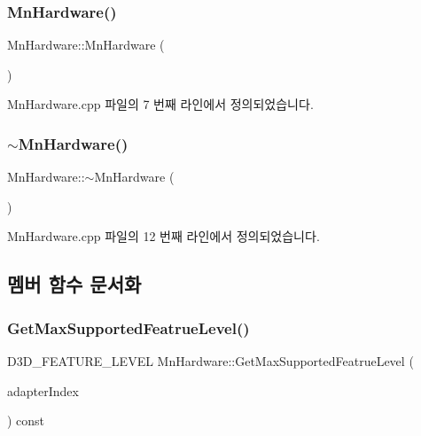 \subsubsection{\texorpdfstring{Mn\+Hardware()}{MnHardware()}}
{\footnotesize\ttfamily Mn\+Hardware\+::\+Mn\+Hardware (\begin{DoxyParamCaption}{ }\end{DoxyParamCaption})}



Mn\+Hardware.\+cpp 파일의 7 번째 라인에서 정의되었습니다.

\mbox{\label{class_m_n_l_1_1_mn_hardware_a875d63cd3b81d293a3f38026816abb7e}} 
\subsubsection{\texorpdfstring{$\sim$\+Mn\+Hardware()}{~MnHardware()}}
{\footnotesize\ttfamily Mn\+Hardware\+::$\sim$\+Mn\+Hardware (\begin{DoxyParamCaption}{ }\end{DoxyParamCaption})}



Mn\+Hardware.\+cpp 파일의 12 번째 라인에서 정의되었습니다.



\subsection{멤버 함수 문서화}
\mbox{\label{class_m_n_l_1_1_mn_hardware_a8912748dc6e28ac992efb0282ee03ce5}} 
\subsubsection{\texorpdfstring{Get\+Max\+Supported\+Featrue\+Level()}{GetMaxSupportedFeatrueLevel()}}
{\footnotesize\ttfamily D3\+D\+\_\+\+F\+E\+A\+T\+U\+R\+E\+\_\+\+L\+E\+V\+EL Mn\+Hardware\+::\+Get\+Max\+Supported\+Featrue\+Level (\begin{DoxyParamCaption}\item[{U\+I\+NT}]{adapter\+Index }\end{DoxyParamCaption}) const}



